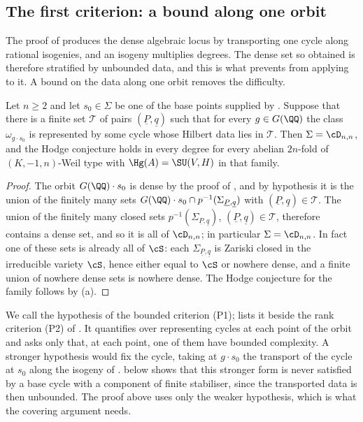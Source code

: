 \subsection{The first criterion: a bound along one orbit}

The proof of  produces the dense algebraic locus by
transporting one cycle along rational isogenies, and an isogeny multiplies
degrees. The dense set so obtained is therefore stratified by unbounded data,
and this is what prevents  from applying to it. A bound
on the data along one orbit removes the difficulty.

\begin{theorem}\label{thm:degreebound}
Let $n\ge2$ and let $s_{0}\in\Sigma$ be one of the base points supplied by
. Suppose that there is a finite set $\mathcal{T}$ of pairs
$(\underline{P},\underline{q})$ such that for every $g\in G(\QQ)$ the class
$\omega_{g\cdot s_{0}}$ is represented by some cycle whose Hilbert data lies
in $\mathcal{T}$. Then $\Sigma=\cD_{n,n}$, and the Hodge conjecture holds in every
degree for every abelian $2n$-fold of $(K,-1,n)$-Weil type with
$\Hg(A)=\SU(V,H)$ in that family.
\end{theorem}

\begin{proof}
The orbit $G(\QQ)\cdot s_{0}$ is dense by the proof of ,
and by hypothesis it is the union of the finitely many sets
$G(\QQ)\cdot s_{0}\cap p^{-1}(\Sigma_{\underline{P},\underline{q}})$ with
$(\underline{P},\underline{q})\in\mathcal{T}$. The union of the finitely
many closed sets $p^{-1}(\Sigma_{\underline{P},\underline{q}})$,
$(\underline{P},\underline{q})\in\mathcal{T}$, therefore contains a dense set,
and so it is all of $\cD_{n,n}$; in particular $\Sigma=\cD_{n,n}$. In fact one
of these sets is already all of $\cS$: each
$\Sigma_{\underline{P},\underline{q}}$ is Zariski closed in the irreducible
variety $\cS$, hence either equal to $\cS$ or nowhere dense, and a finite
union of nowhere dense sets is nowhere dense. The Hodge conjecture for the
family follows by (a).
\end{proof}

\begin{remark}\label{rem:chosencycle}
We call the hypothesis of  the bounded criterion
\textup{(P1)}; \cite[Remark~3.7]{paperII} lists it beside the rank criterion
\textup{(P2)} of \cite[Theorem~2.3]{paperII}. It quantifies over representing
cycles at each point of the orbit and asks only that, at each point, one of
them have bounded complexity. A stronger hypothesis would fix the cycle,
taking at $g\cdot s_{0}$ the transport of the cycle at $s_{0}$ along the
isogeny of .  below shows that this
stronger form is never satisfied by a base cycle with a component of finite
stabiliser, since the transported data is then unbounded. The proof above
uses only the weaker hypothesis, which is what the covering argument needs.
\end{remark}

